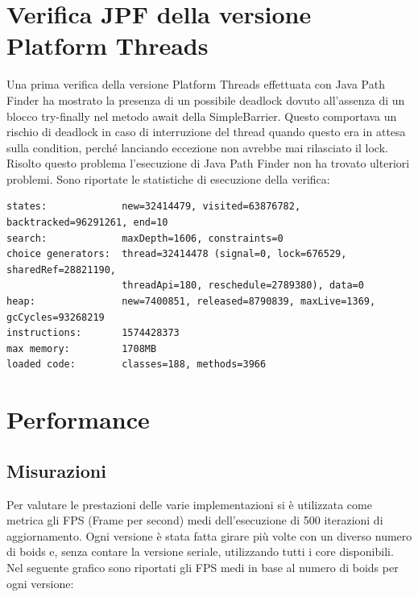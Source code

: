 \documentclass[11pt,notitlepage]{article}
\begin{document}
\section{Verifica JPF della versione Platform Threads}
Una prima verifica della versione Platform Threads effettuata con Java Path Finder ha mostrato la presenza di un possibile deadlock dovuto all'assenza di un blocco try-finally
nel metodo \textsf{await} della \textsf{SimpleBarrier}. Questo comportava un rischio di deadlock in caso di interruzione del thread quando questo era in attesa sulla condition, perché 
lanciando eccezione non avrebbe mai rilasciato il lock.
Risolto questo problema l'esecuzione di Java Path Finder non ha trovato ulteriori problemi.
Sono riportate le statistiche di esecuzione della verifica:
\begin{verbatim}
states:             new=32414479, visited=63876782, backtracked=96291261, end=10
search:             maxDepth=1606, constraints=0
choice generators:  thread=32414478 (signal=0, lock=676529, sharedRef=28821190, 
                    threadApi=180, reschedule=2789380), data=0
heap:               new=7400851, released=8790839, maxLive=1369, gcCycles=93268219
instructions:       1574428373
max memory:         1708MB
loaded code:        classes=188, methods=3966
\end{verbatim}

\section{Performance}

\subsection{Misurazioni}

Per valutare le prestazioni delle varie implementazioni si è utilizzata come metrica gli FPS (Frame per second) medi dell'esecuzione di 500 iterazioni di aggiornamento.
Ogni versione è stata fatta girare più volte con un diverso numero di boids e, senza contare la versione seriale, utilizzando tutti i core disponibili.
Nel seguente grafico sono riportati gli FPS medi in base al numero di boids per ogni versione:
\end{document}
